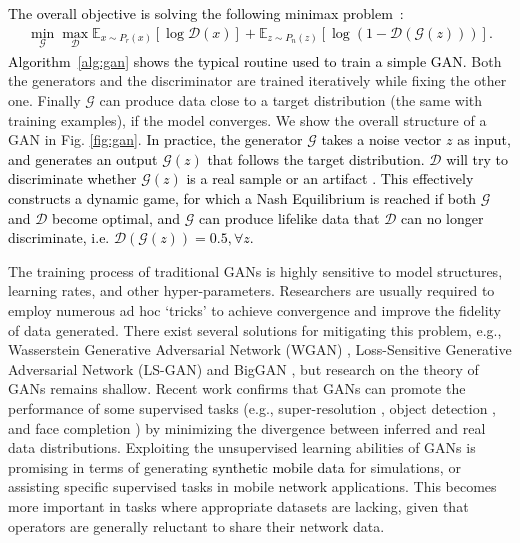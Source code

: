 \documentclass[journal,comsoc,letter]{IEEEtran}
\newcommand{\edit}[1]{\textcolor{black}{#1}}
\newcommand{\rev}[1]{\textcolor{black}{#1}}
\begin{document}
\edit{The overall objective is solving the following minimax problem~\cite{goodfellow2014generative}:
\begin{equation*}
\label{eq:minmax}
\begin{aligned}
\min\limits_{\mathcal{G}}\max\limits_{\mathcal{D}} \mathbb{E}_{x\sim P_r(x)}[\log \mathcal{D}(x)]+\mathbb{E}_{z\sim P_n(z)}[\log(1- \mathcal{D}(\mathcal{G}(z)))].
\end{aligned}
\end{equation*}}\rev{Algorithm~\ref{alg:gan} shows the typical routine used to train a simple GAN.} Both the generators and the discriminator are trained iteratively while fixing the other one. Finally $\mathcal{G}$ can produce data close to a target distribution (the same with training examples), if the model converges. We show the overall structure of a GAN in Fig. \ref{fig:gan}. \rev{In practice, the generator $\mathcal{G}$ takes a noise vector $z$ as input, and generates an output $\mathcal{G}(z)$ that follows the target distribution. $\mathcal{D}$ will try to discriminate whether $\mathcal{G}(z)$ is a real sample or an artifact \cite{goodfellow2016nips}. This effectively constructs a dynamic game, for which a Nash Equilibrium is reached if both $\mathcal{G}$ and $\mathcal{D}$ become optimal, and $\mathcal{G}$ can produce lifelike data that $\mathcal{D}$ can no longer discriminate, i.e. $\mathcal{D}(\mathcal{G}(z))=0.5, \forall z$.}

The training process of traditional GANs is highly sensitive to model structures, learning rates, and other hyper-parameters. Researchers are usually required to employ numerous ad hoc `tricks' to achieve convergence and improve the fidelity of data generated. There exist several solutions for mitigating this problem, e.g., Wasserstein Generative Adversarial Network (WGAN) \cite{arjovsky2017wasserstein}, Loss-Sensitive Generative Adversarial Network (LS-GAN) \cite{qi2017loss} and BigGAN \cite{brock2018large}, but research on the theory of GANs remains shallow.  Recent work confirms that GANs can promote the performance of some supervised tasks (e.g., super-resolution \cite{ledig2017photo}, object detection \cite{li2017perceptual}, and face completion \cite{li2017generative}) by minimizing the divergence between inferred and real data distributions. Exploiting the unsupervised learning abilities of GANs is promising in terms of generating \edit{synthetic mobile data} for simulations, or assisting specific supervised tasks in mobile network applications. This becomes more important in tasks where appropriate datasets are lacking, given that operators are generally reluctant to share their network data.
\end{document}
